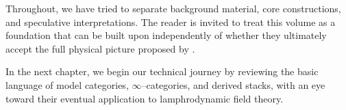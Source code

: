 Throughout, we have tried to separate background material, core constructions,
and speculative interpretations. The reader is invited to treat this volume as
a foundation that can be built upon independently of whether they ultimately
accept the full physical picture proposed by \rsvpabbr{}.

\bigskip
In the next chapter, we begin our technical journey by reviewing the basic
language of model categories, $\infty$--categories, and derived stacks, with
an eye toward their eventual application to lamphrodynamic field theory.

